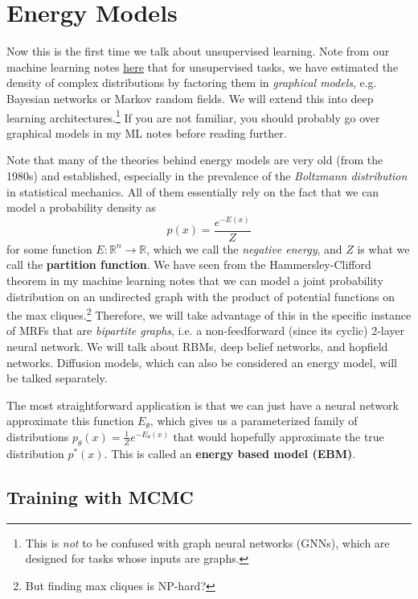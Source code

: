 \section{Energy Models} 

  Now this is the first time we talk about unsupervised learning. Note from our machine learning notes \href{../Machine_Learning/paper.pdf#sec:graphical_models}{here} that for unsupervised tasks, we have estimated the density of complex distributions by factoring them in \textit{graphical models}, e.g. Bayesian networks or Markov random fields. We will extend this into deep learning architectures.\footnote{This is \textit{not} to be confused with graph neural networks (GNNs), which are designed for tasks whose inputs are graphs.} If you are not familiar, you should probably go over graphical models in my ML notes before reading further. 

  Note that many of the theories behind energy models are very old (from the 1980s) and established, especially in the prevalence of the \textit{Boltzmann distribution} in statistical mechanics. All of them essentially rely on the fact that we can model a probability density as 
  \begin{equation}
    p(x) = \frac{e^{-E(x)}}{Z}
  \end{equation}
  for some function $E: \mathbb{R}^n \rightarrow \mathbb{R}$, which we call the \textit{negative energy}, and $Z$ is what we call the \textbf{partition function}. We have seen from the Hammersley-Clifford theorem in my machine learning notes that we can model a joint probability distribution on an undirected graph with the product of potential functions on the max cliques.\footnote{But finding max cliques is NP-hard?} Therefore, we will take advantage of this in the specific instance of MRFs that are \textit{bipartite graphs}, i.e. a non-feedforward (since its cyclic) 2-layer neural network. We will talk about RBMs, deep belief networks, and hopfield networks. Diffusion models, which can also be considered an energy model, will be talked separately. 

  The most straightforward application is that we can just have a neural network approximate this function $E_\theta$, which gives us a parameterized family of distributions $p_\theta (x) = \frac{1}{Z} e^{-E_\theta (x)}$ that would hopefully approximate the true distribution $p^\ast (x)$. This is called an \textbf{energy based model (EBM)}. 

\subsection{Training with MCMC}

